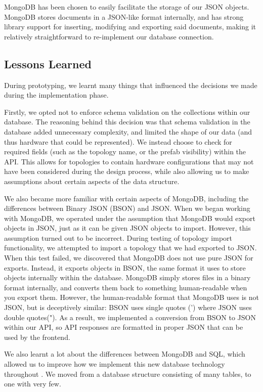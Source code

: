 \documentclass[11pt]{article}
\begin{document}
		MongoDB has been chosen to easily facilitate the storage of our JSON objects.
		MongoDB stores documents in a JSON-like format internally, and has strong library support for inserting, modifying and exporting said documents, making it relatively straightforward to re-implement our database connection.

	\subsection{Lessons Learned}
		During prototyping, we learnt many things that influenced the decisions we made during the implementation phase.

		Firstly, we opted not to enforce schema validation on the collections within our database.
		The reasoning behind this decision was that schema validation in the database added unnecessary complexity, and limited the shape of our data (and thus hardware that could be represented).
		We instead choose to check for required fields (such as the topology name, or the prefab visibility) within the API.
		This allows for topologies to contain hardware configurations that may not have been considered during the design process, while also allowing us to make assumptions about certain aspects of the data structure.

		We also became more familiar with certain aspects of MongoDB, including the differences between Binary JSON (BSON) and JSON.
		When we began working with MongoDB, we operated under the assumption that MongoDB would export objects in JSON, just as it can be given JSON objects to import.
		However, this assumption turned out to be incorrect. 
		During testing of topology import functionality, we attempted to import a topology that we had exported to JSON.
		When this test failed, we discovered that MongoDB does not use pure JSON for exports.
		Instead, it exports objects in BSON, the same format it uses to store objects internally within the database.
		MongoDB simply stores files in a binary format internally, and converts them back to something human-readable when you export them. 
		However, the human-readable format that MongoDB uses is not JSON, but is deceptively similar: BSON uses single quotes (') where JSON uses double quotes(").
		As a result, we implemented a conversion from BSON to JSON within our API, so API responses are formatted in proper JSON that can be used by the frontend.

		We also learnt a lot about the differences between MongoDB and SQL, which allowed us to improve how we implement this new database technology throughout \opendc{}.
		We moved from a database structure consisting of many tables, to one with very few.
\end{document}
